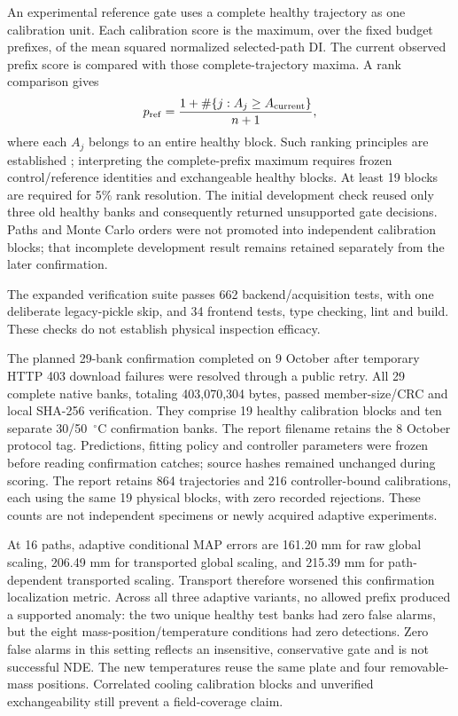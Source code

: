 An experimental reference gate uses a complete healthy trajectory as one
calibration unit. Each calibration score is the maximum, over the fixed budget
prefixes, of the mean squared normalized selected-path DI. The current observed
prefix score is compared with those complete-trajectory maxima. A rank comparison gives
\begin{equation}
 p_{\rm ref}=\frac{1+\#\{j:A_j\geq A_{\rm current}\}}{n+1},
 \label{eq:measured-reference-rank}
\end{equation}
where each $A_j$ belongs to an entire healthy block. Such ranking principles
are established \cite{shafer2008conformal}; interpreting the complete-prefix
maximum requires frozen control/reference identities and exchangeable healthy
blocks. At least 19 blocks are required for 5\% rank resolution. The initial
development check reused only three old healthy banks and consequently returned
unsupported gate decisions. Paths and Monte Carlo orders were not promoted
into independent calibration blocks; that incomplete development result remains
retained separately from the later confirmation.

The expanded verification suite passes 662 backend/acquisition tests, with one deliberate legacy-pickle skip, and 34 frontend tests, type checking, lint and build. These checks do not establish physical inspection efficacy.

The planned 29-bank confirmation completed on 9 October after temporary
HTTP 403 download failures were resolved through a public retry. All 29
complete native banks, totaling 403,070,304 bytes, passed member-size/CRC and
local SHA-256 verification. They comprise 19 healthy calibration blocks and ten
separate 30/50~$^{\circ}$C confirmation banks. The report filename retains the
8 October protocol tag. Predictions, fitting policy
and controller parameters were frozen before reading confirmation catches;
source hashes remained unchanged during scoring. The report retains 864
trajectories and 216 controller-bound calibrations, each using the same 19
physical blocks, with zero recorded rejections. These counts are not independent
specimens or newly acquired adaptive experiments.

At 16 paths, adaptive conditional MAP errors are 161.20 mm for raw global
scaling, 206.49 mm for transported global scaling, and 215.39 mm for
path-dependent transported scaling. Transport therefore worsened this
confirmation localization metric. Across all three adaptive variants, no
allowed prefix produced a supported anomaly: the two unique healthy test
banks had zero false alarms, but the eight mass-position/temperature conditions
had zero detections. Zero false alarms in this setting reflects an insensitive,
conservative gate and is not successful NDE. The new temperatures reuse the
same plate and four removable-mass positions. Correlated cooling calibration
blocks and unverified exchangeability still prevent a field-coverage claim.

